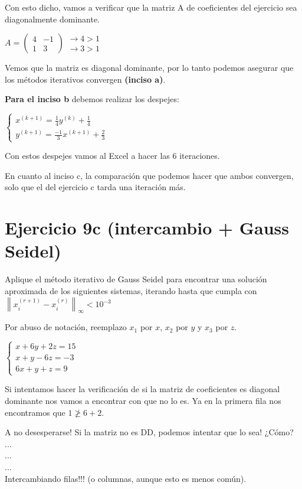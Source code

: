 \documentclass[11pt]{article}
\begin{document}
	Con esto dicho, vamos a verificar que la matriz A de coeficientes del ejercicio sea diagonalmente dominante.
	
	$A=\begin{pmatrix}
		4 & -1 \\
		1 &3
	\end{pmatrix}$$\begin{matrix}
	\rightarrow 4 > 1 \\
	\rightarrow 3 > 1
\end{matrix}$

	Vemos que la matriz es diagonal dominante, por lo tanto podemos asegurar que los métodos iterativos convergen \textbf{(inciso a)}.
	
	\textbf{Para el inciso b} debemos realizar los despejes:
	
	$\begin{cases}
		x^{(k+1)}=\frac{1}{4}y^{(k)}+\frac{1}{4}\\
		y^{(k+1)}=\frac{-1}{3}x^{(k+1)}+\frac{2}{3}
	\end{cases}$

	Con estos despejes vamos al Excel a hacer las 6 iteraciones.
	
	En cuanto al inciso c, la comparación que podemos hacer que ambos convergen, solo que el del ejercicio c tarda una iteración más.
	
	\section{Ejercicio 9c (intercambio + Gauss Seidel)}
	Aplique el método iterativo de Gauss Seidel para encontrar una solución aproximada de los siguientes sistemas, iterando hasta que cumpla con $\left\lVert x_i^{(r+1)}-x_i^{(r)} \right \rVert_\infty < 10^{-3}$
	
	Por abuso de notación, reemplazo $x_1$ por $x$, $x_2$ por $y$ y $x_3$ por $z$.
	
	$\begin{cases}
		x+6y+2z=15\\
		x+y-6z=-3\\
		6x+y+z=9
	\end{cases}$

	Si intentamos hacer la verificación de si la matriz de coeficientes es diagonal dominante nos vamos a encontrar con que no lo es. Ya en la primera fila nos encontramos que $1\ngeq6+2$.
	
	A no desesperarse! Si la matriz no es DD, podemos intentar que lo sea! ¿Cómo? ...\\
	...\\
	...\\
	Intercambiando filas!!! (o columnas, aunque esto es menos común).
	
\end{document}

